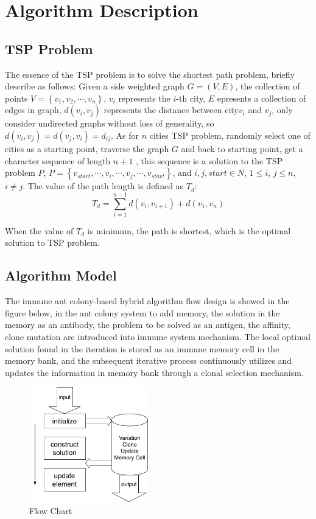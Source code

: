 \documentclass[11pt,a4paper,oldfontcommands]{memoir}
\begin{document}
\section{Algorithm Description}
\subsection{TSP Problem}
The essence of the TSP problem is to solve the shortest path problem, briefly describe as follows: Given a side weighted graph $G= \left ( V,E \right )$, the collection of points $V=\left \{v_{1},v_{2},\cdots ,v_{n} \right \}$, $v_{i}$ represents the $i$-th city, $E$ epresents a collection of edges in graph, $d\left ( v_{i},v_{j} \right )$ represents the distance between city$v_{i}$  and $v_{j}$, only consider undirected graphs without loss of generality, so $d\left ( v_{i},v_{j} \right ) =d\left ( v_{j},v_{i} \right )= d_{ij}$. As for $n$ cities TSP problem, randomly select one of cities as a starting point,  traverse the graph $G$ and back to starting point, get a character sequence of length $n+1$ , this sequence is a solution to the TSP problem $P$, $P=\left \{ v_{start},\cdots,v_{i},\cdots,v_{j},\cdots,v_{start} \right \}$, and $i,j,start \in N$, $1 \leqslant i$, $j \leqslant n$, $i \neq j$.
The value of the path length is defined as $T_{d}$: 
\begin{equation}
T_{d}=\sum_{i=1}^{n-1}d\left (v_{i},v_{i+1}\right )+d\left (v_{1},v_{n} \right)
\tag {1}
\end{equation} 
\par
When the value of $T_{d}$ is minimum, the path is shortest, which is the optimal solution to TSP problem.

\subsection{Algorithm Model}
The immune ant colony-based hybrid algorithm flow design is showed in the figure below, in the ant colony system to add memory, the solution in the memory as an antibody, the problem to be solved as an antigen, the affinity, clone mutation are introduced into immune system mechanism. The local optimal solution found in the iteration is stored as an immune memory cell in the memory bank, and the subsequent iterative process continuously utilizes and updates the information in memory bank through a clonal selection mechanism.

\begin{figure}[!htb]
\centering
\includegraphics[height=5cm]{img/flow-chart.png}
\caption{Flow Chart}
\end{figure}
\end{document}
